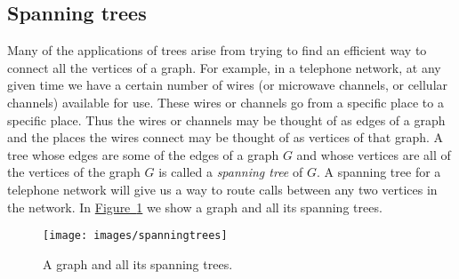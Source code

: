 \documentclass[10pt,]{book}
\theoremstyle{plain}
\theoremstyle{definition}
\theoremstyle{definition}
\numberwithin{equation}{chapter}
\begin{document}
\subsection[{Spanning trees}]{Spanning trees}\label{subsection-18}
Many of the applications of trees arise from trying to find an efficient way to connect all the vertices of a graph. For example, in a telephone network, at any given time we have a certain number of wires (or microwave channels, or cellular channels) available for use. These wires or channels go from a specific place to a specific place. Thus the wires or channels may be thought of as edges of a graph and the places the wires connect may be thought of as vertices of that graph. A tree whose edges are some of the edges of a graph \(G\) and whose vertices are all of the vertices of the graph \(G\) is called a \emph{spanning tree} of \(G\). A spanning tree for a telephone network will give us a way to route calls between any two vertices in the network. In \hyperref[spanningtrees]{Figure~\ref{spanningtrees}} we show a graph and all its spanning trees.%
\begin{figure}
\centering
\texttt{[image: images/spanningtrees]}
\caption{A graph and all its spanning trees.\label{spanningtrees}}
\end{figure}
\end{document}
